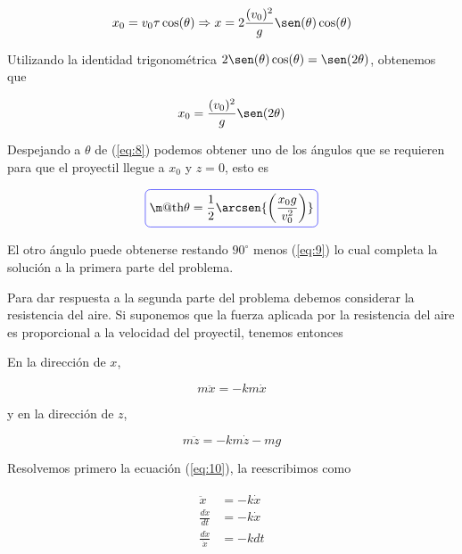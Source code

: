 \documentclass[a4paper,10pt]{article}
\makeatletter
\numberwithin{equation}{section}
\newcommand*{\boxcolor}{blue}
\renewcommand{\boxed}[1]{\textcolor{\boxcolor}{%
\tikz[baseline={([yshift=-1ex]current bounding box.center)}] \node [rectangle, minimum width=1ex,rounded corners,draw] {\normalcolor\m@th$\displaystyle#1$};}}
\makeatother
\begin{document}
\begin{equation*}
 x_0 = v_0 \tau \cos(\theta) \Rightarrow x = 2 \frac{(v_0)^2}{g} \sen(\theta)\cos(\theta)
\end{equation*}

Utilizando la identidad trigonométrica $2\sen(\theta)\cos(\theta) = \sen (2\theta)$,
obtenemos que

\begin{equation}
 x_0 = \frac{(v_0)^2}{g} \sen(2\theta)
 \label{eq:8}
\end{equation}

Despejando a $\theta$ de (\ref{eq:8}) podemos obtener uno de los ángulos que se 
requieren para que el proyectil llegue a $x_0$ y $z=0$, esto es


\begin{equation}
 \boxed{\theta = \frac{1}{2} \arcsen{\left(\frac{x_0 g}{v_0^2}\right)}}
 \label{eq:9}
\end{equation}

El otro ángulo puede obtenerse restando $90^\circ$ menos (\ref{eq:9}) lo 
cual completa la solución a la primera parte del problema.

\vspace{.3cm}

Para dar respuesta a la segunda parte del problema debemos considerar la 
resistencia del aire. Si suponemos que la fuerza aplicada por la resistencia 
del aire es proporcional a la velocidad del proyectil, tenemos entonces

En la dirección de $x$,

\begin{equation}
 m\ddot{x} = - k m \dot{x}
 \label{eq:10}
\end{equation}

y en la dirección de $z$,

\begin{equation}
 m \ddot{z} = - k m \dot{z} - mg
 \label{eq:11}
\end{equation}

Resolvemos primero la ecuación (\ref{eq:10}), la reescribimos como

\begin{align}
\begin{split}
 \ddot{x} &= - k \dot{x} \\
 \frac{d \dot{x}}{dt} &= - k \dot{x} \\
 \frac{d \dot{x}}{\dot{x}} &= - k dt
 \end{split}
\end{align}
\end{document}
